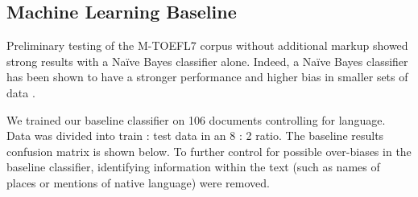 \documentclass[10pt, a4paper]{article}
\begin{document}
\subsection{Machine Learning Baseline\label{sec:ml-baseline}}
Preliminary testing of the M-TOEFL7 corpus without additional markup showed strong results with a Naïve Bayes classifier alone. Indeed, a Naïve Bayes classifier has been shown to have a stronger performance and higher bias in smaller sets of data \cite{forman-2004}. 

We trained our baseline classifier on 106 documents controlling for language. Data was divided into train : test data in an 8 : 2 ratio. The baseline results confusion matrix is shown below. To further control for possible over-biases in the baseline classifier, identifying information within the text (such as names of places or mentions of native language) were removed. 
\end{document}
